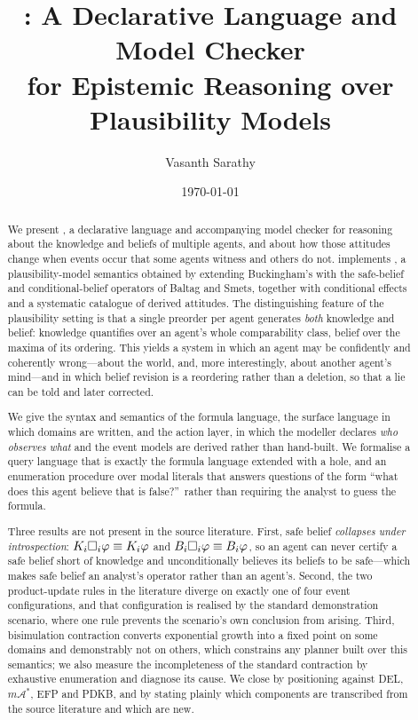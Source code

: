 \documentclass[11pt,a4paper]{article}
\title{\textbf{\delhi: A Declarative Language and Model Checker\\
for Epistemic Reasoning over Plausibility Models}}
\author{Vasanth Sarathy}
\date{\today}
\begin{document}
\maketitle

\begin{abstract}
We present \delhi, a declarative language and accompanying model checker for reasoning about
the knowledge and beliefs of multiple agents, and about how those attitudes change when
events occur that some agents witness and others do not. \delhi{} implements \mBplus, a
plausibility-model semantics obtained by extending Buckingham's \mB{} with the safe-belief
and conditional-belief operators of Baltag and Smets, together with conditional effects and
a systematic catalogue of derived attitudes. The distinguishing feature of the plausibility
setting is that a single preorder per agent generates \emph{both} knowledge and belief:
knowledge quantifies over an agent's whole comparability class, belief over the maxima of
its ordering. This yields a system in which an agent may be confidently and coherently
wrong---about the world, and, more interestingly, about another agent's mind---and in which
belief revision is a reordering rather than a deletion, so that a lie can be told and later
corrected.

We give the syntax and semantics of the formula language, the surface language in which
domains are written, and the action layer, in which the modeller declares \emph{who observes
what} and the event models are derived rather than hand-built. We formalise a query language
that is exactly the formula language extended with a hole, and an enumeration procedure over
modal literals that answers questions of the form ``what does this agent believe that is
false?''\ rather than requiring the analyst to guess the formula.

Three results are not present in the source literature. First, safe belief \emph{collapses
under introspection}: $K_{i}\Box_{i}\varphi \equiv K_{i}\varphi$ and
$B_{i}\Box_{i}\varphi \equiv B_{i}\varphi$, so an agent can never certify a safe belief
short of knowledge and unconditionally believes its beliefs to be safe---which makes safe
belief an analyst's operator rather than an agent's. Second, the two product-update rules in
the literature diverge on exactly one of four event configurations, and that configuration is
realised by the standard demonstration scenario, where one rule prevents the scenario's own
conclusion from arising. Third, bisimulation contraction converts exponential growth into a
fixed point on some domains and demonstrably not on others, which constrains any planner
built over this semantics; we also measure the incompleteness of the standard contraction by
exhaustive enumeration and diagnose its cause. We close by positioning \mBplus{} against DEL,
$m\mathcal{A}^*$, EFP and PDKB, and by stating plainly which components are transcribed from
the source literature and which are new.
\end{abstract}
\end{document}
